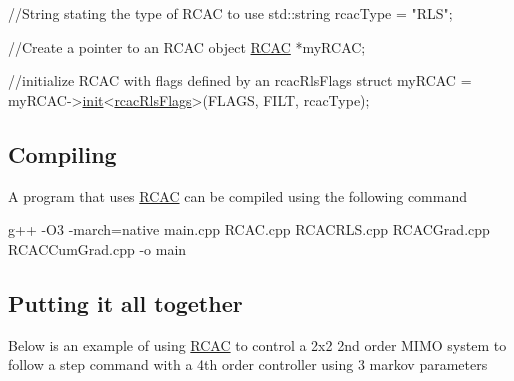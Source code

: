 \begin{DoxyCode}
\textcolor{comment}{//String stating the type of RCAC to use}
std::string rcacType = \textcolor{stringliteral}{"RLS"};

\textcolor{comment}{//Create a pointer to an RCAC object}
\hyperlink{class_r_c_a_c}{RCAC} *myRCAC;

\textcolor{comment}{//initialize RCAC with flags defined by an rcacRlsFlags struct}
myRCAC = myRCAC->\hyperlink{class_r_c_a_c_af7b7133b676886d5010be725291c1a1d}{init}<\hyperlink{structrcac_rls_flags}{rcacRlsFlags}>(FLAGS, FILT, rcacType);
\end{DoxyCode}


\subsection*{Compiling }

A program that uses \hyperlink{class_r_c_a_c}{R\+C\+AC} can be compiled using the following command 
\begin{DoxyCode}
g++ -O3 -march=native main.cpp RCAC.cpp RCACRLS.cpp RCACGrad.cpp RCACCumGrad.cpp -o main
\end{DoxyCode}


\subsection*{Putting it all together }

Below is an example of using \hyperlink{class_r_c_a_c}{R\+C\+AC} to control a 2x2 2nd order M\+I\+MO system to follow a step command with a 4th order controller using 3 markov parameters


